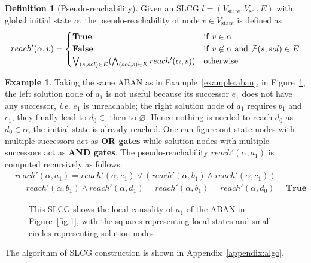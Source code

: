 \documentclass{article}
\theoremstyle{definition}
\newtheorem{definition}{Definition}
\newtheorem{example}{Example}
\newcommand{\st}{{\mathrm{state}}}
\newcommand{\sol}{{\mathrm{sol}}}
\begin{document}
\begin{definition}[Pseudo-reachability]\label{defPseudoReach}
Given an SLCG $l=(V_\st,V_\sol,E)$ with global initial state $\alpha$, the pseudo-reachability of node $v\in V_\st$ is defined as
\begin{equation}
\nonumber
    reach'(\alpha,v)=
    \begin{cases}
    \mathrm{\bf True} & {\rm if\ } v\in \alpha\\
    \mathrm{\bf False} & {\rm if\ } v\not\in \alpha\ {\rm and} \not\exists(s,sol) \in E\\
    \bigvee_{(s,sol) \in E} (\bigwedge_{(sol,s)\in E} reach'(\alpha,s)) & {\rm otherwise}
\end{cases}
\end{equation}

\end{definition}
\begin{example}\label{example:SLCG}
Taking the same ABAN as in Example~\ref{example:aban}, in Figure~\ref{fig:2}, the left solution node of $a_1$ is not useful because its successor $e_1$ does not have any successor, \textit{i.e.} $e_1$ is unreachable;
the right solution node of $a_1$ requires $b_1$ and $c_1$, they finally lead to $d_0\in$ then to $\varnothing$.
Hence nothing is needed to reach $d_0$ as $d_0\in \alpha$, the initial state is already reached.
One can figure out state nodes with multiple successors act as \textbf{OR gates} while solution nodes with multiple successors act as \textbf{AND gates}. The pseudo-reachability $reach'(\alpha,a_1)$ is computed recursively as follows:
\begin{align*}
&reach'(\alpha,a_1)=reach'(\alpha,e_1)\lor(reach'(\alpha,b_1)\land reach'(\alpha,c_1))\\
&=reach'(\alpha,b_1)\land reach'(\alpha,d_1)=reach'(\alpha,b_1)=reach'(\alpha,d_0)=\mathbf{True}
\end{align*}
\end{example}

\begin{figure}[ht]
\centering

\caption{This SLCG shows the local causality of $a_1$ of the ABAN in Figure~\ref{fig:1}, with the squares representing local states and small circles representing solution nodes}
\label{fig:2}
\end{figure}

The algorithm of SLCG construction is shown in Appendix~\ref{appendix:algo}.
\end{document}

